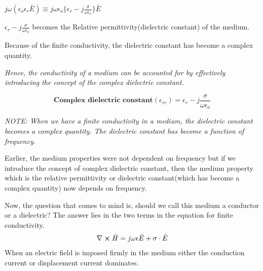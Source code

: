 \begin{center}
$j \omega(\epsilon_{o}\epsilon_{r}\bar{E}) \equiv j\omega\epsilon_{o}\bigg\{\epsilon_{r} -j \frac{\sigma}{\omega\epsilon_{o}}\bigg\}\bar{E}$ 
\end{center}

$\epsilon_{r} -j \frac{\sigma}{\omega\epsilon_{o}}$ becomes the Relative permittivity(dielectric constant) of the medium.

Because of the finite conductivity, the dielectric constant has become a complex quantity.

\textit{Hence, the conductivity of a medium can be accounted for by effectively introducing the concept of the complex dielectric constant.}

\begin{equation}
\textbf{Complex dielectric constant} (\epsilon_{rc}) = \epsilon_{r} -j \frac{\sigma}{\omega\epsilon_{o}}
\end{equation}

\textit{NOTE: When we have a finite conductivity in a medium, the dielectric constant becomes a complex quantity. The dielectric constant has become a function of frequency.}

Earlier, the medium properties were not dependent on frequency but if we introduce the concept of complex dielectric constant, then the medium property which is the relative permittivity or dielectric constant(which has become a complex quantity) now depends on frequency.

Now, the question that comes to mind is, should we call this medium a conductor or a dielectric? The answer lies in the two terms in the equation for finite conductivity.
\begin{align*}
\nabla \cross \bar{H} = j\omega\epsilon\bar{E} + \sigma\cdot\bar{E} 
\end{align*}
When an electric field is imposed firmly in the medium either the conduction current or displacement current dominates.

